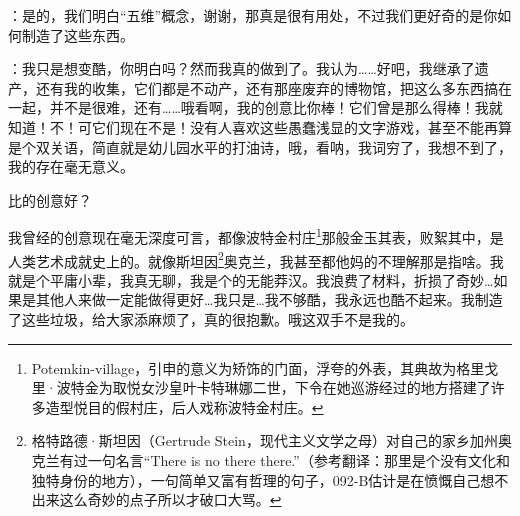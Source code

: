 \begin{scpbox}


：是的，我们明白“五维”概念，谢谢，那真是很有用处，不过我们更好奇的是你如何制造了这些东西。

：我只是想变酷，你明白吗？然而我真的做到了。我认为……好吧，我继承了遗产，还有我的收集，它们都是不动产，还有那座废弃的博物馆，把这么多东西搞在一起，并不是很难，还有……哦看啊，我的创意比你棒！它们曾是那么得棒！我就知道！不！可它们现在不是！没有人喜欢这些愚蠢浅显的文字游戏，甚至不能再算是个双关语，简直就是幼儿园水平的打油诗，哦，看呐，我词穷了，我想不到了，我的存在毫无意义。

比的创意好？

我曾经的创意现在毫无深度可言，都像波特金村庄\footnote{Potemkin-village，引申的意义为矫饰的门面，浮夸的外表，其典故为格里戈里·波特金为取悦女沙皇叶卡特琳娜二世，下令在她巡游经过的地方搭建了许多造型悦目的假村庄，后人戏称波特金村庄。}那般金玉其表，败絮其中，是人类艺术成就史上的。就像斯坦因\footnote{格特路德·斯坦因（Gertrude Stein，现代主义文学之母）对自己的家乡加州奥克兰有过一句名言“There is no there there.”（参考翻译：那里是个没有文化和独特身份的地方），一句简单又富有哲理的句子，092-B估计是在愤慨自己想不出来这么奇妙的点子所以才破口大骂。}奥克兰，我甚至都他妈的不理解那是指啥。我就是个平庸小辈，我真无聊，我是个的无能莽汉。我浪费了材料，折损了奇妙…如果是其他人来做一定能做得更好…我只是…我不够酷，我永远也酷不起来。我制造了这些垃圾，给大家添麻烦了，真的很抱歉。哦这双手不是我的。


\end{scpbox}
